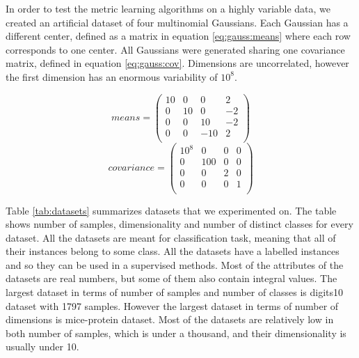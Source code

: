 \documentclass[12pt,a4paper]{report}
\begin{document}
In order to test the metric learning algorithms on a highly variable data, we created an artificial dataset of four multinomial Gaussians. Each Gaussian has a different center, defined as a matrix in equation \eqref{eq:gauss:means} where each row corresponds to one center. All Gaussians were generated sharing one covariance matrix, defined in equation \eqref{eq:gauss:cov}. Dimensions are uncorrelated, however the first dimension has an enormous variability of $10^8$.

\begin{equation} \label{eq:gauss:means}
means = \begin{pmatrix}
10 & 0 & 0 & 2 \\
0 & 10 & 0 & -2 \\
0 & 0 & 10 & -2 \\
0 & 0 & -10 & 2 \\
\end{pmatrix}
\end{equation}
\begin{equation} \label{eq:gauss:cov}
covariance = \begin{pmatrix}
10^8 & 0 & 0 & 0 \\
0 & 100 & 0 & 0 \\
0 & 0 & 2 & 0 \\
0 & 0 & 0 & 1 \\
\end{pmatrix}
\end{equation}

Table \ref{tab:datasets} summarizes datasets that we experimented on. The table shows number of samples, dimensionality and number of distinct classes for every dataset. All the datasets are meant for classification task, meaning that all of their instances belong to some class. All the datasets have a labelled instances and so they can be used in a supervised methods. Most of the attributes of the datasets are real numbers, but some of them also contain integral values. The largest dataset in terms of number of samples and number of classes is digits10 dataset with 1797 samples. However the largest dataset in terms of number of dimensions is mice-protein dataset. Most of the datasets are relatively low in both number of samples, which is under a thousand, and their dimensionality is usually under 10.
\end{document}
